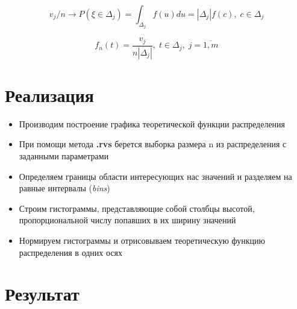 \documentclass[12pt]{article}
\begin{document}
\begin{equation}
    \label{eq:1}
    v_j/n \to P(\xi \in \Delta_j) = \int_{\Delta_j}f(u)du = |\Delta_j|f(c), \; c \in \Delta_j
\end{equation}


\begin{equation}
    \label{eq:2}
	f_n(t)= \frac{v_j}{n|\Delta_j|}, \; t \in \Delta_j, \; j = \overline{1, m}
\end{equation}




\section*{Реализация}
\begin{itemize}
	\item Производим построение графика теоретической функции распределения
	\item При помощи метода \textbf{.rvs} берется выборка размера n из распределения с заданными параметрами
	\item Определяем границы области интересующих нас значений и разделяем на равные интервалы (\textit{bins})
	\item Строим гистограммы, представляющие собой столбцы высотой, пропорциональной числу попавших в их ширину значений
	\item Нормируем гистограммы и отрисовываем теоретическую функцию распределения в одних осях  
\end{itemize}


\newpage
\section*{Результат}
\end{document}
